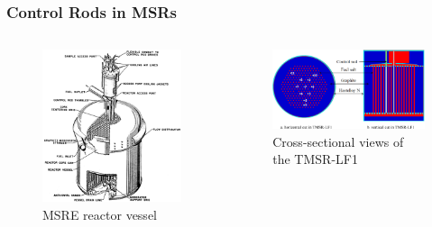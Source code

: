 \begin{frame}
  \frametitle{Control Rods in MSRs}
  \begin{columns}
    \hfill
    \column[t]{5cm}
    \vspace{.2cm}
    \begin{figure}
      \centering
      \includegraphics[width=\columnwidth]{images/msre-cutout}
      \caption{\footnotesize MSRE reactor vessel \cite{robertson_msre_1965}}
    \end{figure}
    \hfill
    \column[t]{6cm}
    \begin{figure}
      \centering
      \includegraphics[width=.8\columnwidth]{images/tmsr}
      \caption{\footnotesize Cross-sectional views of the TMSR-LF1
}
\end{figure}
\end{columns}
\end{frame}
